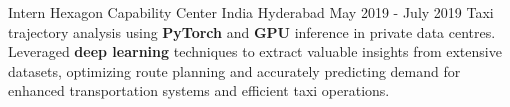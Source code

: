 \begin{cventries}
\vspace{-1mm}

\cventry
    {Intern} %
    {Hexagon Capability Center India} %
    {Hyderabad} %
    {May 2019 - July 2019} %
    {
        Taxi trajectory analysis using \textbf{PyTorch} and \textbf{GPU} inference in private data centres. Leveraged \textbf{deep learning} techniques to extract valuable insights from extensive datasets, optimizing route planning and accurately predicting demand for enhanced transportation systems and efficient taxi operations.
    }

\end{cventries}

\vspace{-2mm}
